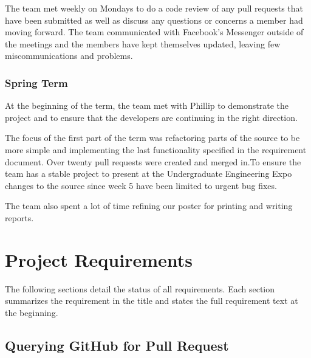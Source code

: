 \documentclass[draftclsnofoot,onecolumn]{IEEEtran}
\begin{document}
The team met weekly on Mondays to do a code review of any pull requests that have been submitted as well as discuss any questions or concerns a member had moving forward. The team communicated with Facebook's Messenger outside of the meetings and the members have kept themselves updated, leaving few miscommunications and problems.

\subsubsection{Spring Term}

At the beginning of the term, the team met with Phillip to demonstrate the project and to ensure that the developers are continuing in the 
right direction.


The focus of the first part of the term was refactoring parts of the source to be more simple and implementing the last functionality specified in the requirement document. Over twenty pull requests were created and merged in.To ensure the team has a stable project to present at the Undergraduate Engineering Expo changes to the source since week 5 have been limited to urgent bug fixes.

The team also spent a lot of time refining our poster for printing and writing reports.

\section{Project Requirements}%

The following sections detail the status of all requirements. Each section summarizes the requirement in the title and states the full requirement text at the beginning.

\subsection{Querying GitHub for Pull Request}%
\end{document}
